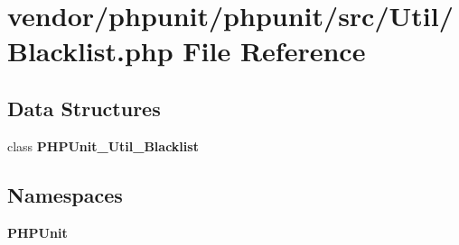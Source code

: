\section{vendor/phpunit/phpunit/src/\+Util/\+Blacklist.php File Reference}
\label{phpunit_2phpunit_2src_2_util_2_blacklist_8php}
\subsection*{Data Structures}
\begin{DoxyCompactItemize}
\item 
class {\bf P\+H\+P\+Unit\+\_\+\+Util\+\_\+\+Blacklist}
\end{DoxyCompactItemize}
\subsection*{Namespaces}
\begin{DoxyCompactItemize}
\item 
 {\bf P\+H\+P\+Unit}
\end{DoxyCompactItemize}
